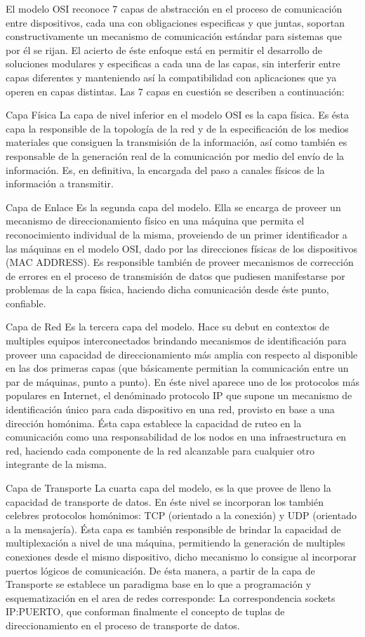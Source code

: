El modelo OSI reconoce 7 capas de abstracción en el proceso de comunicación entre dispositivos, cada una con obligaciones especificas y que juntas, soportan constructivamente un mecanismo de comunicación estándar para sistemas que por él se rijan. El acierto de éste enfoque está en permitir el desarrollo de soluciones modulares y especificas a cada una de las capas, sin interferir entre capas diferentes y manteniendo así la compatibilidad con aplicaciones que ya operen en capas distintas. Las 7 capas en cuestión se describen a continuación:

Capa Física
La capa de nivel inferior en el modelo OSI es la capa física. Es ésta capa la responsible de la topología de la red y de la especificación de los medios materiales que consiguen la transmisión de la información, así como también es responsable de la generación real de la comunicación por medio del envío de la información. Es, en definitiva, la encargada del paso a canales físicos de la información a transmitir.

Capa de Enlace
Es la segunda capa del modelo. Ella se encarga de proveer un mecanismo de direccionamiento físico en una máquina que permita el reconocimiento individual de la misma, proveiendo de un primer identificador a las máquinas en el modelo OSI, dado por las direcciones físicas de los dispositivos (MAC ADDRESS). Es responsible también de proveer mecanismos de corrección de errores en el proceso de transmisión de datos que pudiesen manifestarse por problemas de la capa física, haciendo dicha comunicación desde éste punto, confiable.

Capa de Red
Es la tercera capa del modelo. Hace su debut en contextos de multiples equipos interconectados brindando mecanismos de identificación para proveer una capacidad de direccionamiento más amplia con respecto al disponible en las dos primeras capas (que básicamente permitian la comunicación entre un par de máquinas, punto a punto). En éste nivel aparece uno de los protocolos más populares en Internet, el denóminado protocolo IP que supone un mecanismo de identificación único para cada dispositivo en una red, provisto en base a una dirección homónima. Ésta capa establece la capacidad de ruteo en la comunicación como una responsabilidad de los nodos en una infraestructura en red, haciendo cada componente de la red alcanzable para cualquier otro integrante de la misma.

Capa de Transporte
La cuarta capa del modelo, es la que provee de lleno la capacidad de transporte de datos. En éste nivel se incorporan los también celebres protocolos homónimos: TCP (orientado a la conexión) y UDP (orientado a la mensajería). Ésta capa es también responsible de brindar la capacidad de multiplexación a nivel de una máquina, permitiendo la generación de multiples conexiones desde el mismo dispositivo, dicho mecanismo lo consigue al incorporar puertos lógicos de comunicación. De ésta manera, a partir de la capa de Transporte se establece un paradigma base en lo que a programación y esquematización en el area de redes corresponde: La correspondencia sockets IP:PUERTO, que conforman finalmente el concepto de tuplas de direccionamiento en el proceso de transporte de datos.

